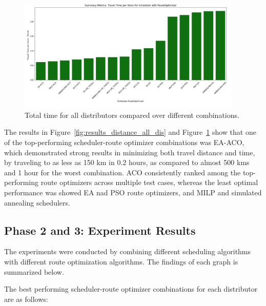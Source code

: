 \begin{figure}[H]
    \centering
    \includegraphics[width=0.95\textwidth]{images/results_time_all_dis}
    \caption{Total time for all distributors compared over different combinations.}
    \label{fig:results_time_all_dis}
\end{figure}

The results in Figure~\ref{fig:results_distance_all_dis} and Figure~\ref{fig:results_time_all_dis} show that one of the top-performing scheduler-route optimizer combinations was EA-ACO, which demonstrated strong results in minimizing both travel distance and time, by traveling 
to as less as 150 km in 0.2 hours, as compared to almost 500 kms and 1 hour for the worst combination. ACO consistently ranked among the top-performing route optimizers across multiple test cases, whereas the least optimal performance was showed EA nad PSO route optimizers, 
and MILP and simulated annealing schedulers.


\subsection{Phase 2 and 3: Experiment Results}
The experiments were conducted by combining different scheduling algorithms with different route optimization algorithms. The findings of each graph is summarized below.



The best performing scheduler-route optimizer combinations for each distributor are as follows:

\begin{table}[H]
    \centering
    \caption{Best performing Scheduler-Route Optimizer combinations by distributor}
    \label{tab:best_schedulers}
    \end{table}
    

